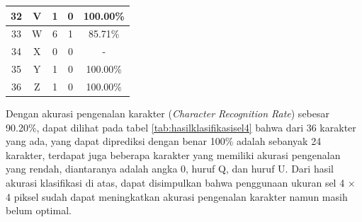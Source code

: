 \begin{longtable}[c]{|c|c|c|c|c|}
	32           & V                 & 1                       & 0                       &100.00\%            \\ \hline
	33           & W                 & 6                       & 1                       &85.71\%            \\ \hline
	34           & X                 & 0                       & 0                       & -            \\ \hline
	35           & Y                 & 1                       & 0                       &100.00\%            \\ \hline
	36           & Z                 & 1                       & 0                       &100.00\%            \\ \hline
\end{longtable}

\noindent Dengan akurasi pengenalan karakter (\textit{Character Recognition Rate}) sebesar 90.20\%, dapat dilihat pada tabel \ref{tab:hasilklasifikasisel4} bahwa dari 36  karakter yang ada, yang dapat diprediksi dengan benar 100\% adalah sebanyak 24 karakter, terdapat juga beberapa karakter yang memiliki akurasi pengenalan yang rendah, diantaranya adalah angka 0, huruf Q, dan huruf U. Dari hasil akurasi klasifikasi di atas, dapat  disimpulkan bahwa penggunaan ukuran sel 4 $\times$ 4 piksel sudah dapat meningkatkan akurasi pengenalan karakter namun masih belum optimal.\\

